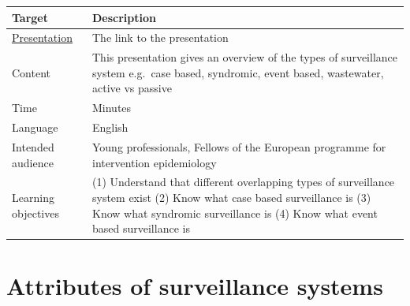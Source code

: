 \documentclass[
  letterpaper,
  DIV=11,
  numbers=noendperiod]{scrreprt}
\begin{document}
\begin{longtable}[]{@{}
  >{\raggedright\arraybackslash}p{}
  >{\raggedright\arraybackslash}p{}@{}}
\toprule\noalign{}
\begin{minipage}[b]{\linewidth}\raggedright
Target
\end{minipage} & \begin{minipage}[b]{\linewidth}\raggedright
Description
\end{minipage} \\
\midrule\noalign{}
\endhead
\bottomrule\noalign{}
\endlastfoot
\href{1_Presentations/presentation_types.html}{Presentation} & The link
to the presentation \\
Content & This presentation gives an overview of the types of
surveillance system e.g.~case based, syndromic, event based, wastewater,
active vs passive \\
Time & 20 Minutes \\
Language & English \\
Intended audience & Young professionals, Fellows of the European
programme for intervention epidemiology \\
Learning objectives & (1) Understand that different overlapping types of
surveillance system exist (2) Know what case based surveillance is (3)
Know what syndromic surveillance is (4) Know what event based
surveillance is \\
\end{longtable}

\section*{Attributes of surveillance
systems}\label{attributes-of-surveillance-systems}

\end{document}
